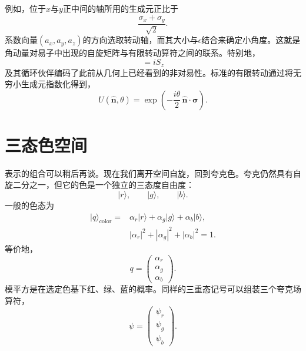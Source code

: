 例如，位于\(x\)与\(y\)正中间的轴所用的生成元正比于
\begin{equation}
\frac{\sigma_x+\sigma_y}{\sqrt2}.
\end{equation}
系数向量\((a_x,a_y,a_z)\)的方向选取转动轴，而其大小与\(\epsilon\)结合来确定小角度。这就是角动量对易子中出现的自旋矩阵与有限转动算符之间的联系。特别地，
\begin{equation}
[S_x,S_y]=iS_z
\end{equation}
及其循环伙伴编码了此前从几何上已经看到的非对易性。标准的有限转动通过将无穷小生成元指数化得到，
\begin{equation}
U(\hat{\boldsymbol n},\theta)
=\exp\left(-\frac{i\theta}{2}\,
\hat{\boldsymbol n}\cdot\boldsymbol\sigma\right).
\end{equation}
\section{三态色空间}

表示的组合可以稍后再谈。现在我们离开空间自旋，回到夸克色。夸克仍然具有自旋二分之一，但它的色是一个独立的三态度自由度：
\begin{equation}
\lvert r\rangle,\qquad
\lvert g\rangle,\qquad
\lvert b\rangle.
\end{equation}
一般的色态为
\begin{equation}
\begin{aligned}
\lvert q\rangle_{\mathrm{color}}
={}&
\alpha_r\lvert r\rangle
+\alpha_g\lvert g\rangle
+\alpha_b\lvert b\rangle,
\\
&|\alpha_r|^2+|\alpha_g|^2+|\alpha_b|^2=1.
\end{aligned}
\end{equation}
等价地，
\begin{equation}
q=
\begin{pmatrix}
\alpha_r\\
\alpha_g\\
\alpha_b
\end{pmatrix}.
\end{equation}
模平方是在选定色基下红、绿、蓝的概率。同样的三重态记号可以组装三个夸克场算符，
\begin{equation}
\psi=
\begin{pmatrix}
\psi_r\\
\psi_g\\
\psi_b
\end{pmatrix}.
\end{equation}

